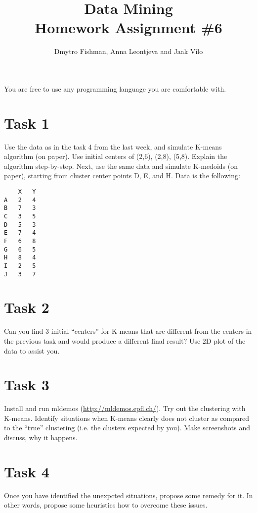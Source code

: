 \documentclass{article}
\title{Data Mining\\Homework Assignment \#6} %
\author{Dmytro Fishman, Anna Leontjeva and Jaak Vilo} %
\begin{document}
\maketitle %

You are free to use any programming language you are comfortable with.

\section*{Task 1}
Use the data as in the task 4 from the last week, and simulate K-means algorithm (on paper). Use initial centers of (2,6), (2,8), (5,8). Explain the algorithm step-by-step. 
Next, use the same data and simulate K-medoids (on paper), starting from cluster center points D, E, and H. Data is the following:
\begin{lstlisting}
	X	Y
A	2	4
B	7	3
C	3	5
D	5	3
E	7	4
F	6	8
G	6	5
H	8	4
I	2	5
J	3	7
\end{lstlisting}
\section*{Task 2}
Can you find 3 initial ``centers'' for K-means that are different from the centers in the previous task and would produce a different final result? Use 2D plot of the data to assist you.

\section*{Task 3}
Install and run mldemos (\url{http://mldemos.epfl.ch/}). Try out the clustering with K-means. Identify situations when K-means clearly does not cluster as compared  to the “true” clustering (i.e. the clusters expected by you). Make screenshots and discuss, why it happens. 

\section*{Task 4}
Once you have identified the unexpcted situations, propose some remedy for it. In other words, propose some heuristics how to overcome these issues.
\end{document}
